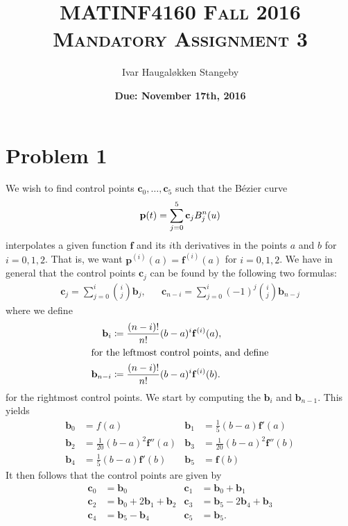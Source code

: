 \documentclass{article}
\title{\textsc{MATINF4160 Fall 2016 \\
Mandatory Assignment 3}}
\date{\small\textbf{Due: November 17th, 2016}}
\author{Ivar Haugal{\o}kken Stangeby}
\renewcommand{\bf}[1]{\mathbf{#1}}
\begin{document}
   \maketitle 

   \section*{Problem 1}
   \label{sec:problem_1}
    
   We wish to find control points $\bf{c}_0, \ldots, \bf{c}_5$ such that the
   B\'ezier curve
   \begin{equation}
       \notag
       \bf{p}(t) = \sum^{5}_{j=0} \bf{c}_j B_j^n(u)
   \end{equation}
   interpolates a given function $\bf{f}$ and its $i$th derivatives in the
   points $a$ and $b$ for $i = 0, 1, 2$. That is, we want $\bf{p}^{(i)}(a) =
   \bf{f}^{(i)}(a)$ for $i = 0, 1, 2$. We have in general that the control
   points $\bf{c}_j$ can be found by the following two formulas:
   \begin{align*}
       \bf{c}_j = \sum^{i}_{j=0} {i \choose j} \bf{b}_j, 
    && \bf{c}_{n-i} = \sum^{i}_{j=0} (-1)^j {i \choose j} \bf{b}_{n-j}
   \end{align*} 
   where we define
   \begin{align*}
       \bf{b}_i &\coloneqq \frac{(n - i)!}{n!} (b-a)^i \bf{f}^{(i)}(a), \\
       \intertext{for the leftmost control points, and define}
       \bf{b}_{n-i} &\coloneqq \frac{(n - i)!}{n!} (b-a)^i \bf{f}^{(i)}(b).
   \end{align*}
   for the rightmost control points. We start by computing the $\bf{b}_i$ and
   $\bf{b}_{n-1}$. This yields
   \begin{align*}
       \bf{b}_0 &=  f(a) & \bf{b}_1 &= \frac{1}{5}(b-a)\bf{f}'(a) \\
       \bf{b}_2 &=  \frac{1}{20}(b-a)^2\bf{f}''(a) & \bf{b}_3 &= \frac{1}{20}(b-a)^2\bf{f}''(b) \\
       \bf{b}_4 &=  \frac{1}{5}(b-a)\bf{f}'(b) & \bf{b}_5 &= \bf{f}(b)
   \end{align*}
   It then follows that the control points are given by
   \begin{align*}
       \bf{c}_0 &=  \bf{b}_0 & \bf{c}_1 &= \bf{b}_0 + \bf{b}_1 \\
       \bf{c}_2 &=  \bf{b}_0 + 2\bf{b}_1 + \bf{b}_2 & \bf{c}_3 &= \bf{b}_5 - 2\bf{b}_4 + \bf{b}_3 \\
       \bf{c}_4 &=  \bf{b}_5 - \bf{b}_4 & \bf{c}_5 &= \bf{b}_5.
   \end{align*}
    
\end{document}
